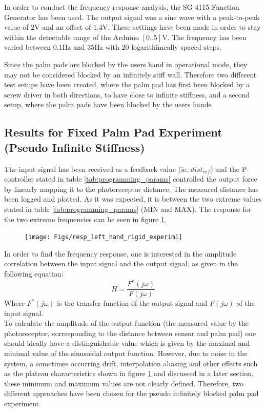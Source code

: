 	In order to conduct the frequency response analysis, the SG-4115 Function Generator has been used. The output signal was a sine wave with a peak-to-peak value of $2$V and an offset of $1.4$V. These settings have been made in order to stay within the detectable range of the Arduino $[0..5]$V. The frequency has been varied between $0.1$Hz and $35$Hz with $20$ logarithimcally spaced steps.
	
	Since the palm pads are blocked by the users hand in operational mode, they may not be considered blocked by an infinitely stiff wall. Therefore two different test setups have been created, where the palm pad has first been blocked by a screw driver in both directions, to have close to infinite stiffness, and a second setup, where the palm pads have been blocked by the users hands.
	
	\subsection{Results for Fixed Palm Pad Experiment (Pseudo Infinite Stiffness)}
	The input signal has been received as a feedback value (ie. $dist_{ref}$) and the P-controller stated in table \ref{tab:programming_params} controlled the output force by linearly mapping it to the photoreceptor distance. The measured distance has been logged and plotted. As it was expected, it is between the two extreme values stated in table \ref{tab:programming_params} (MIN and MAX). The response for the two extreme frequencies can be seen in figure \ref{fig:resp_left_hand_rigid_experim1}.
	\begin{figure}[h!]
		\centering
		\texttt{[image: Figs/resp\_left\_hand\_rigid\_experim1]}
		\caption{}
		\label{fig:resp_left_hand_rigid_experim1}
	\end{figure}
	
	In order to find the frequency response, one is interested in the amplitude correlation between the input signal and the output signal, as given in the following equation:%
	\begin{equation}
		H = \frac{F^*(j\omega)}{F(j\omega)}
	\end{equation}
	Where $F^*(j\omega)$ is the transfer function of the output signal and $F(j\omega)$ of the input signal.\\
	To calculate the amplitude of the output function (the measured value by the photoreceptor, corresponding to the distance between sensor and palm pad) one should ideally have a distinguishable value which is given by the maximal and minimal value of the sinusoidal output function. However, due to noise in the system, a sometimes occurring drift, interpolation aliasing and other effects such as the plateau characteristics shown in figure \ref{fig:resp_left_hand_rigid_experim1} and discussed in a later section, these minimum and maximum values are not clearly defined. Therefore, two different approaches have been chosen for the pseudo infinitely blocked palm pad experiment.
	
